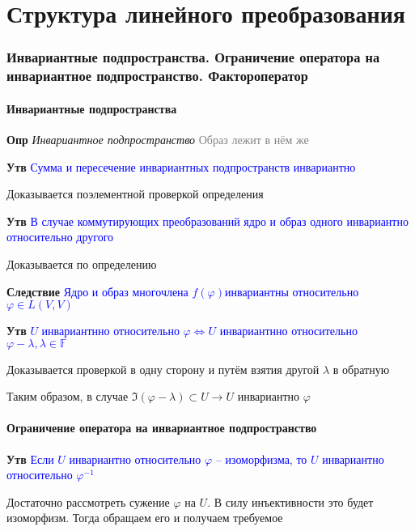 \documentclass[a4paper, 14pt]{article}
\begin{document}
     \part*{Структура линейного преобразования}

    \section{Инвариантные подпространства.
    Ограничение оператора на инвариантное подпространство.
    Фактороператор}

    \subsection{Инвариантные подпространства}

    \textbf{Опр} \textit{Инвариантное подпространство} \textcolor{gray}{Образ лежит в нём же}

    \textbf{Утв} \textcolor{blue}{Сумма и пересечение инвариантных подпространств инвариантно}

    Доказывается поэлементной проверкой определения

    \textbf{Утв} \textcolor{blue}{В случае коммутирующих преобразований ядро и образ одного инвариантно относительно
    другого}

    Доказывается по определению

    \textbf{Следствие} \textcolor{blue}{Ядро и образ многочлена $f(\varphi)$инвариантны относительно $\varphi \in L(V, V)$}

    \textbf{Утв} \textcolor{blue}{$U$ инвариантнно относительно $\varphi \Leftrightarrow U$ инвариантнно
    относительно $\varphi - \lambda, \lambda \in \mathbb{F}$}

    Доказывается проверкой в одну сторону и путём взятия другой $\lambda$ в обратную

    Таким образом, в случае $\Im (\varphi - \lambda) \subset U \rightarrow U$ инвариантно $\varphi$

    \subsection{Ограничение оператора на инвариантное подпространство}

    \textbf{Утв} \textcolor{blue}{Если $U$ инвариантно относительно $\varphi$ -- изоморфизма, то $U$ инвариантно
    относительно $\varphi^{-1}$}

    Достаточно рассмотреть сужение $\varphi$ на $U$.
    В силу инъективности это будет изоморфизм.
    Тогда обращаем его и получаем требуемое
\end{document}
